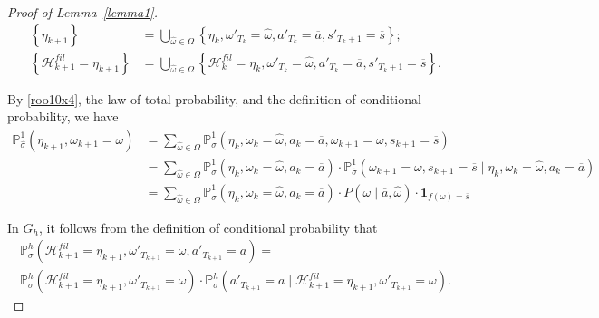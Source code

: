 \documentclass[10pt,a4paper]{amsart}
\renewcommand{\P}{\mathbb{P}}
\begin{document}
\begin{proof}[Proof of Lemma~\ref{lemma1}]
\begin{equation}
\begin{aligned}
\left\{\eta_{k+1}\right\} &= \bigcup_{\widehat \omega \in \Omega} \left\{\eta_{k}, \omega'_{T_{k}} = \widehat \omega, a'_{T_{k}} = \overline a, s'_{T_{k}+1} = \overline s \right\}; \\
\left\{\mathcal H^{fil}_{k+1} = \eta_{k+1}\right\} &= \bigcup_{\widehat \omega \in \Omega} \left\{\mathcal H^{fil}_{k} = \eta_{k}, \omega'_{T_{k}} = \widehat \omega, a'_{T_{k}} = \overline a, s'_{T_{k}+1} = \overline s \right\}.
\end{aligned}
\label{roo10x4}
\end{equation}


By \eqref{roo10x4}, the law of total probability, and the definition of conditional probability, we have
\begin{equation}
\begin{aligned}
\mathbb{P}_{\widehat{\sigma}}^1(\eta_{k+1}, \omega_{k+1} = \omega) 
&= \sum_{\widehat{\omega} \in \Omega} \mathbb{P}_{\widehat{\sigma}}^1(\eta_k, \omega_k = \widehat{\omega}, a_k = \overline{a}, \omega_{k+1} = \omega, s_{k+1} = \overline{s}) \\
&= \sum_{\widehat{\omega} \in \Omega} \mathbb{P}_{\widehat{\sigma}}^1(\eta_k, \omega_k = \widehat{\omega}, a_k = \overline{a}) \cdot \mathbb{P}_{\widehat{\sigma}}^1(\omega_{k+1} = \omega, s_{k+1} = \overline{s} \mid \eta_k, \omega_k = \widehat{\omega}, a_k = \overline{a}) \\
&= \sum_{\widehat{\omega} \in \Omega} \mathbb{P}_{\widehat{\sigma}}^1(\eta_k, \omega_k = \widehat{\omega}, a_k = \overline{a}) \cdot P(\omega \mid \overline{a}, \widehat{\omega}) \cdot \mathbf{1}_{f(\omega) = \overline{s}}
\end{aligned}
\label{roo10x1}
\end{equation}

In $G_h$, it follows from the definition of conditional probability that
\begin{multline}
\P_{\sigma}^h(\mathcal H^{fil}_{k+1} = \eta_{k+1}, \omega'_{T_{k+1}} = \omega, a'_{T_{k+1}} = a) = \\ \P_{\sigma}^h(\mathcal H^{fil}_{k+1} = \eta_{k+1}, \omega'_{T_{k+1}} = \omega) \cdot \P_{\sigma}^h(a'_{T_{k+1}} = a \mid \mathcal H^{fil}_{k+1} = \eta_{k+1}, \omega'_{T_{k+1}} = \omega).
\label{roo11}
\end{multline}


\end{proof}
\end{document}
